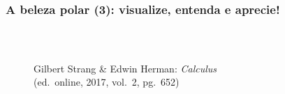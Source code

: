 \documentclass[pdftex, brazil, aspectratio=169]{beamer}
\begin{document}
\begin{frame}[t]
  \frametitle{A beleza polar (3): visualize, entenda e aprecie!}
  \begin{columns}
    \centering
    \begin{figure}[H]
      \begin{center}
        \label{fig:int2-22}
        \\
        \footnotesize{Gilbert Strang \& Edwin Herman: \emph{Calculus}
          (ed.\ online, 2017, vol.\ 2, pg.\ 652)}
      \end{center}
    \end{figure}
    \centering
    \begin{figure}[H]
      \begin{center}
        \label{fig:int2-23}
        \\

\end{center}
\end{figure}
\end{columns}
\end{frame}
\end{document}
